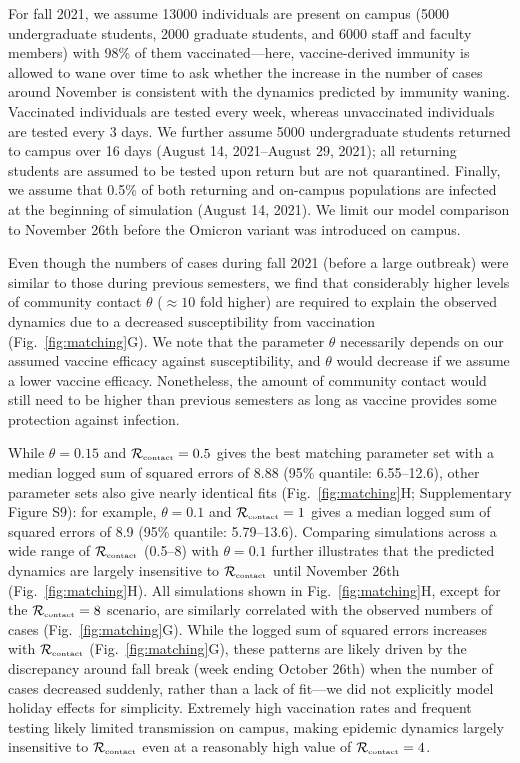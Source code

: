 \documentclass[12pt]{article}
\newcommand{\fref}[1]{Fig.~\ref{fig:#1}}
\newcommand{\Rx}[1]{\ensuremath{{\mathcal R}_{#1}}}
\newcommand{\Rc}{\Rx{\textrm{\tiny{contact}}}}
\begin{document}
For fall 2021, we assume 13000 individuals are present on campus (5000 undergraduate students, 2000 graduate students, and 6000 staff and faculty members) with 98\% of them vaccinated---here, vaccine-derived immunity is allowed to wane over time to ask whether the increase in the number of cases around November is consistent with the dynamics predicted by immunity waning.
Vaccinated individuals are tested every week, whereas unvaccinated individuals are tested every 3 days. 
We further assume 5000 undergraduate students returned to campus over 16 days (August 14, 2021--August 29, 2021);
all returning students are assumed to be tested upon return but are not quarantined.
Finally, we assume that 0.5\% of both returning and on-campus populations are infected at the beginning of simulation (August 14, 2021).
We limit our model comparison to November 26th before the Omicron variant was introduced on campus.

Even though the numbers of cases during fall 2021 (before a large outbreak) were similar to those during previous semesters, we find that considerably higher levels of community contact $\theta$ ($\approx 10$ fold higher) are required to explain the observed dynamics due to a decreased susceptibility from vaccination (\fref{matching}G).
We note that the parameter $\theta$ necessarily depends on our assumed vaccine efficacy against susceptibility, and $\theta$ would decrease if we assume a lower vaccine efficacy.
Nonetheless, the amount of community contact would still need to be higher than previous semesters as long as vaccine provides some protection against infection.

While $\theta = 0.15$ and $\Rc = 0.5$ gives the best matching parameter set with a median logged sum of squared errors of 8.88 (95\% quantile: 6.55--12.6), other parameter sets also give nearly identical fits (\fref{matching}H; Supplementary Figure S9):
for example, $\theta = 0.1$ and $\Rc = 1$ gives a median logged sum of squared errors of 8.9 (95\% quantile: 5.79--13.6).
Comparing simulations across a wide range of $\Rc$ (0.5--8) with $\theta = 0.1$ further illustrates that the predicted dynamics are largely insensitive to $\Rc$ until November 26th (\fref{matching}H).
All simulations shown in \fref{matching}H, except for the $\Rc=8$ scenario, are similarly correlated with the observed numbers of cases (\fref{matching}G). 
While the logged sum of squared errors increases with $\Rc$ (\fref{matching}G), these patterns are likely driven by the discrepancy around fall break (week ending October 26th) when the number of cases decreased suddenly, rather than a lack of fit---we did not explicitly model holiday effects for simplicity.
Extremely high vaccination rates and frequent testing likely limited transmission on campus, making epidemic dynamics largely insensitive to $\Rc$ even at a reasonably high value of $\Rc = 4$.
\end{document}
